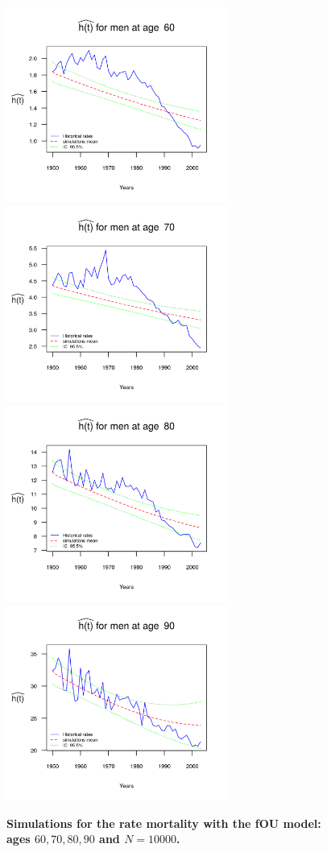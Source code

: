 \documentclass[smallextended]{svjour3}
\begin{document}
\begin{figure}[H]
    \includegraphics[width = 2.85in]{PlotMen60.png}
    \includegraphics[width = 2.85in]{PlotMen70.png}
    \includegraphics[width = 2.85in]{PlotMen80.png}
    \includegraphics[width = 2.85in]{PlotMen90.png}
    \caption{\bf Simulations for the rate mortality with the fOU model: ages 
    $60,70,80,90$ and $N=10000$.}
    \label{graph-simu_FOU4}
\end{figure}\vspace*{0.1cm}
\end{document}
